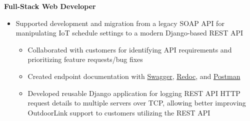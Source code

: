 \documentclass[a4paper]{article}
\begin{document}
\noindent
\hspace{0.120in}
\textbf{Full-Stack Web Developer}
\smallskip

\begin{itemize}
    \item Supported development and migration from a legacy SOAP API for manipulating
          IoT schedule settings to a modern Django-based REST API
          \begin{itemize}
              \item Collaborated with customers for identifying API requirements and
                    prioritizing feature requests/bug fixes
              \item Created endpoint documentation with
                    \href{https://swagger.io/solutions/api-documentation/}{Swagger},
                    \href{https://redoc.ly/}{Redoc}, and
                    \href{https://www.postman.com/}{Postman}
              \item Developed reusable Django application for logging REST API HTTP
                    request details to multiple servers over TCP, allowing better
                    improving OutdoorLink support to customers utilizing the REST API
          \end{itemize}
\end{itemize}
\end{document}
